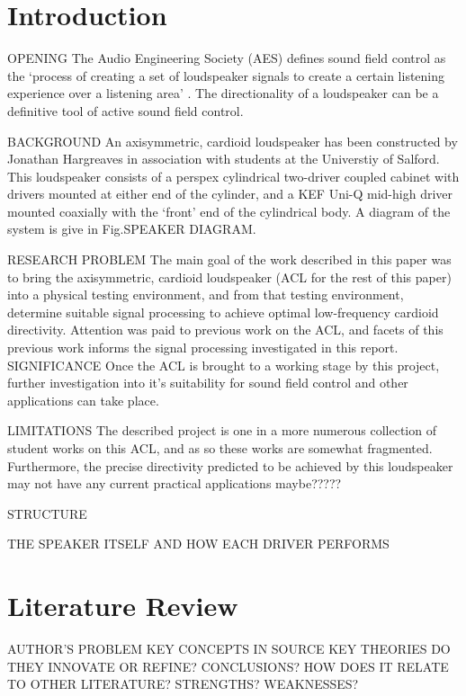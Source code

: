 \documentclass{report}
\begin{document}
\tableofcontents
\newpage

\chapter{Introduction}
    OPENING
    The Audio Engineering Society (AES) defines sound field control as the `process of creating a set of loudspeaker signals to create a certain listening experience over a listening area' \cite{AESsoundfieldcontrol}.
    The directionality of a loudspeaker can be a definitive tool of active sound field control.

    BACKGROUND
    An axisymmetric, cardioid loudspeaker has been constructed by Jonathan Hargreaves in association with students at the Universtiy of Salford.
    This loudspeaker consists of a perspex cylindrical two-driver coupled cabinet with drivers mounted at either end of the cylinder, and a KEF Uni-Q mid-high driver mounted coaxially with the `front' end of the cylindrical body.
    A diagram of the system is give in Fig.SPEAKER DIAGRAM.



    RESEARCH PROBLEM
    The main goal of the work described in this paper was to bring the axisymmetric, cardioid loudspeaker (ACL for the rest of this paper) into a physical testing environment, and from that testing environment, determine suitable signal processing to achieve optimal low-frequency cardioid directivity.
    Attention was paid to previous work on the ACL, and facets of this previous work informs the signal processing investigated in this report.
    SIGNIFICANCE
    Once the ACL is brought to a working stage by this project, further investigation into it's suitability for sound field control and other applications can take place.

    LIMITATIONS
    The described project is one in a more numerous collection of student works on this ACL, and as so these works are somewhat fragmented.
    Furthermore, the precise directivity predicted to be achieved by this loudspeaker may not have any current practical applications maybe?????

    STRUCTURE

    THE SPEAKER ITSELF AND HOW EACH DRIVER PERFORMS



\chapter{Literature Review}
    AUTHOR'S PROBLEM
    KEY CONCEPTS IN SOURCE
    KEY THEORIES
    DO THEY INNOVATE OR REFINE?
    CONCLUSIONS?
    HOW DOES IT RELATE TO OTHER LITERATURE?
    STRENGTHS?
    WEAKNESSES?
\end{document}
